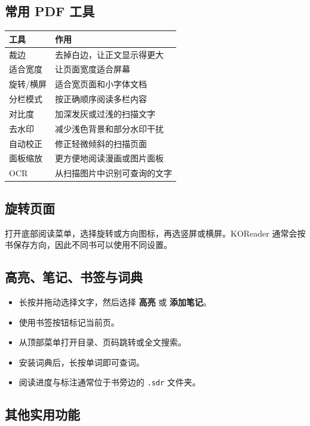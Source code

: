 \documentclass[10pt,a4paper]{article}
\begin{document}
\subsection{常用 PDF 工具}

\begin{longtable}{@{}p{}p{}@{}}
\toprule
\textbf{工具} & \textbf{作用} \\
\midrule
裁边 & 去掉白边，让正文显示得更大 \\
适合宽度 & 让页面宽度适合屏幕 \\
旋转/横屏 & 适合宽页面和小字体文档 \\
分栏模式 & 按正确顺序阅读多栏内容 \\
对比度 & 加深发灰或过浅的扫描文字 \\
去水印 & 减少浅色背景和部分水印干扰 \\
自动校正 & 修正轻微倾斜的扫描页面 \\
面板缩放 & 更方便地阅读漫画或图片面板 \\
OCR & 从扫描图片中识别可查询的文字 \\
\bottomrule
\end{longtable}

\subsection{旋转页面}

打开底部阅读菜单，选择旋转或方向图标，再选竖屏或横屏。KOReader 通常会按书保存方向，因此不同书可以使用不同设置。

\subsection{高亮、笔记、书签与词典}

\begin{itemize}
  \item 长按并拖动选择文字，然后选择 \textbf{高亮} 或 \textbf{添加笔记}。
  \item 使用书签按钮标记当前页。
  \item 从顶部菜单打开目录、页码跳转或全文搜索。
  \item 安装词典后，长按单词即可查词。
  \item 阅读进度与标注通常位于书旁边的 \texttt{.sdr} 文件夹。
\end{itemize}

\subsection{其他实用功能}
\end{document}
